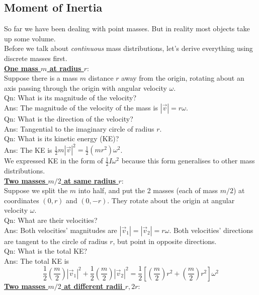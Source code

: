 \documentclass{article}
\begin{document}
\subsection{Moment of Inertia}
So far we have been dealing with point masses. But in reality most objects take up some volume. \\[10pt]
Before we talk about \textit{continuous} mass distributions, let's derive everything using discrete masses first. \\[10pt]
\underline{\textbf{One mass $m$ at radius $r$}}: \\[2pt]
Suppose there is a mass $m$ distance $r$ away from the origin, rotating about an axis passing through the origin with angular velocity $\omega$. \\[10pt]
Qn: What is its magnitude of the velocity? \\[0pt]
Ans: The magnitude of the velocity of the mass is $|\vec{v}| = r\omega$. \\[10pt]
Qn: What is the direction of the velocity? \\[0pt]
Ans: Tangential to the imaginary circle of radius $r$. \\[10pt]
Qn: What is its kinetic energy (KE)? \\[0pt]
Ans: The KE is $\frac{1}{2} m |\vec{v}|^2 = \frac{1}{2} (mr^2) \omega^2$.\\[10pt]
We expressed KE in the form of $\frac{1}{2} I \omega^2$ because this form generalises to other mass distributions. \\[10pt]
\underline{\textbf{Two masses $m/2$ at same radius $r$}}: \\[2pt] Suppose we split the $m$ into half, and put the 2 masses (each of mass $m/2$) at coordinates $(0,r)$ and $(0,-r)$. They rotate about the origin at angular velocity $\omega$. \\[10pt]
Qn: What are their velocities? \\[0pt]
Ans: Both velocities' magnitudes are $|\vec{v}_1| = |\vec{v}_2| = r\omega$. Both velocities' directions are tangent to the circle of radius $r$, but point in opposite directions. \\[10pt]
Qn: What is the total KE? \\[0pt]
Ans: The total KE is $$\frac{1}{2} \left(\frac{m}{2}\right) |\vec{v}_1|^2 + \frac{1}{2} \left(\frac{m}{2}\right) |\vec{v}_2|^2 = \frac{1}{2} \left[ \left(\frac{m}{2} \right) r^2 + \left( \frac{m}{2}\right) r^2 \right] \omega^2 $$
\underline{\textbf{Two masses $m/2$ at different radii $r,2r$}}: \\[2pt]
\end{document}
